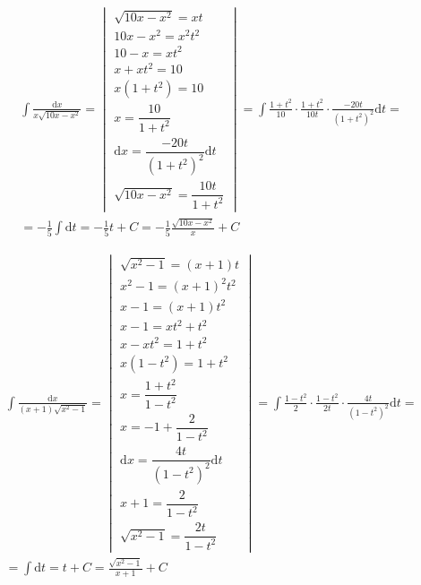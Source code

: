 \begin{gather*}
\int{\frac{\mbox{d}x}{x\sqrt{10x-x^2}}} =
\begin{vmatrix}
  \sqrt{10x-x^2}=xt \\
  10x-x^2=x^2t^2 \\
  10-x=xt^2 \\
  x+xt^2=10 \\
  x(1+t^2)=10\\
  x=\dfrac{10}{1+t^2} \\
  \mbox{d}x=\dfrac{-20t}{(1+t^2)^2}\mbox{d}t \\
  \sqrt{10x-x^2}=\dfrac{10t}{1+t^2}
\end{vmatrix}
= \int{\frac{1+t^2}{10}\cdot \frac{1+t^2}{10t}\cdot \frac{-20t}{(1+t^2)^2}}\mbox{d}t = \\
= -\frac{1}{5} \int{\mbox{d}t}
= -\frac{1}{5} t + C
= -\frac{1}{5}\frac{\sqrt{10x-x^2}}{x}+C
\end{gather*}


\begin{gather*}
\int{\frac{\mbox{d}x}{(x+1)\sqrt{x^2-1}}} =
\begin{vmatrix}
  \sqrt{x^2-1}=(x+1)t\\
  x^2-1=(x+1)^2t^2\\
  x-1=(x+1)t^2\\
  x-1=xt^2+t^2\\
  x-xt^2=1+t^2\\
  x(1-t^2)=1+t^2\\
  x=\dfrac{1+t^2}{1-t^2}\\
  x=-1+\dfrac{2}{1-t^2}\\
  \mbox{d}x=\dfrac{4t}{(1-t^2)^2}\mbox{d}t\\
  x+1=\dfrac{2}{1-t^2}\\
  \sqrt{x^2-1}=\dfrac{2t}{1-t^2}
\end{vmatrix}
= \int{\frac{1-t^2}{2}\cdot \frac{1-t^2}{2t}\cdot \frac{4t}{(1-t^2)^2}\mbox{d}t} = \\
= \int{\mbox{d}t} = t + C
= \frac{\sqrt{x^2-1}}{x+1} + C
\end{gather*}


